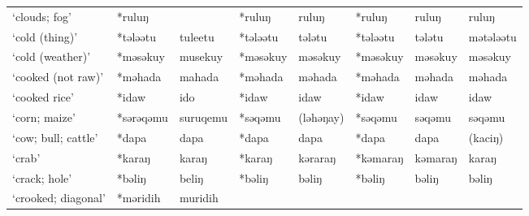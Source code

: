 \begin{landscape}
\begin{longtable}[c]{@{}p{3cm}<{\raggedright}p{2.75cm}<{\raggedright}p{2.75cm}<{\raggedright}p{2.75cm}<{\raggedright}p{2.75cm}<{\raggedright}p{2.75cm}<{\raggedright}p{2.75cm}<{\raggedright}p{2.75cm}<{\raggedright}@{}}
`clouds; fog'                                        & *ruluŋ       &                               & *ruluŋ         & ruluŋ                      & *ruluŋ           & ruluŋ                    & ruluŋ                             \\
`cold (thing)'                                       & *tələətu     & tuleetu                       & *tələətu       & tələtu                     & *tələətu         & tələtu                   & mətələətu                         \\
`cold (weather)'                                     & *məsəkuy     & musekuy                       & *məsəkuy       & məsəkuy                    & *məsəkuy         & məsəkuy                  & məsəkuy                           \\
`cooked (not raw)'                                   & *məhada      & mahada                        & *məhada        & məhada                     & *məhada          & məhada                   & məhada                            \\
`cooked rice'                                        & *idaw        & ido                           & *idaw          & idaw                       & *idaw            & idaw                     & idaw                              \\
`corn; maize'                                        & *sərəqəmu    & suruqemu                      & *səqəmu        & (ləhəŋay)                  & *səqəmu          & səqəmu                   & səqəmu                            \\
`cow; bull; cattle'                                  & *dapa        & dapa                          & *dapa          & dapa                       & *dapa            & dapa                     & (kaciŋ)                           \\
`crab'                                               & *karaŋ       & karaŋ                         & *karaŋ         & kəraraŋ                    & *kəmaraŋ         & kəmaraŋ                  & karaŋ                             \\
`crack; hole'                                        & *bəliŋ       & beliŋ                         & *bəliŋ         & bəliŋ                      & *bəliŋ           & bəliŋ                    & bəliŋ                             \\
`crooked; diagonal'                                  & *məridih     & muridih                       &                &                            &                  &                          &                                   \\

\end{longtable}
\end{landscape}

